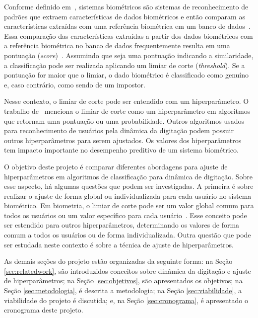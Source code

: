 Conforme definido em~\cite{Jain2004_IntroToBiometrics}, sistemas biométricos são sistemas de reconhecimento de padrões que extraem características de dados biométricos e então comparam as características extraídas com uma referência biométrica em um banco de dados~\cite{Jain2004_IntroToBiometrics}. Essa comparação das características extraídas a partir dos dados biométricos com a referência biométrica no banco de dados frequentemente resulta em uma pontuação (\textit{score})~\cite{Jain2016_50Years}. Assumindo que seja uma pontuação indicando a similaridade, a classificação pode ser realizada aplicando um limiar de corte (\textit{threshold}). Se a pontuação for maior que o limiar, o dado biométrico é classificado como genuíno e, caso contrário, como sendo de um impostor.

Nesse contexto, o limiar de corte pode ser entendido com um hiperparâmetro. O trabalho de~\cite{hpo_foundations_algorithms_and_open_challenges} menciona o limiar de corte como um hiperparâmetro em algoritmos que retornam uma pontuação ou uma probabilidade. Outros algoritmos usados para reconhecimento de usuários pela dinâmica da digitação podem possuir outros hiperparâmetros para serem ajustados. Os valores dos hiperparâmetros tem impacto importante no desempenho preditivo de um sistema biométrico.

O objetivo deste projeto é comparar diferentes abordagens para ajuste de hiperparâmetros em algoritmos de classificação para dinâmica de digitação. Sobre esse aspecto, há algumas questões que podem ser investigadas. A primeira é sobre realizar o ajuste de forma global ou individualizada para cada usuário no sistema biométrico. Em biometria, o limiar de corte pode ser um valor global comum para todos os usuários ou um valor específico para cada usuário~\cite{Giot2011Unconstrained, Mhenni2019DoubleSerial}. Esse conceito pode ser estendido para outros hiperparâmetros, determinando os valores de forma comum a todos os usuários ou de forma individualizada. Outra questão que pode ser estudada neste contexto é sobre a técnica de ajuste de hiperparâmetros.

As demais seções do projeto estão organizadas da seguinte forma: na Seção \ref{sec:relatedwork}, são introduzidos conceitos sobre dinâmica da digitação e ajuste de hiperparâmetros; na Seção \ref{sec:objetivos}, são apresentados os objetivos; na Seção \ref{sec:metodologia}, é descrita a metodologia; na Seção \ref{sec:viabilidade}, a viabilidade do projeto é discutida; e, na Seção \ref{sec:cronograma}, é apresentado o cronograma deste projeto.


